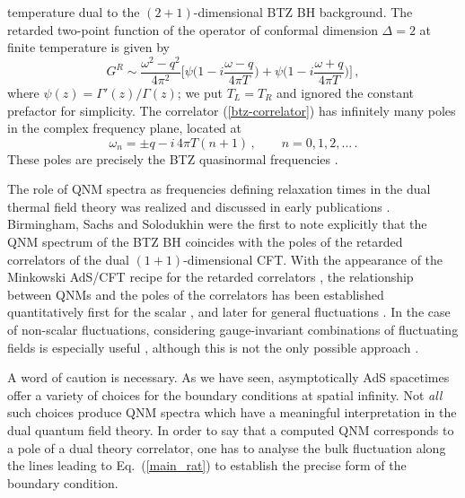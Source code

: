 \documentclass[]{iopart}
\def\be{\begin{equation}}
\def\ee{\end{equation}}
\begin{document}
temperature dual to the $(2+1)$-dimensional BTZ BH background.  The retarded
two-point function of the operator of conformal dimension $\Delta =2$ at
finite temperature is given by \cite{Son:2002sd}
%
\be
G^R \sim \frac{\omega^2-q^2}{4\pi^2} \Biggl[ \psi \Biggl( 1 - i \frac{\omega - q}{4 \pi T} \Biggr)
+ \psi \Biggl( 1 - i \frac{\omega + q}{4 \pi T} \Biggr) \Biggr]\,,
\label{btz-correlator}
\ee
%
where $\psi(z) = \Gamma'(z)/\Gamma(z)$; we put $T_L=T_R$ and ignored the
constant prefactor for simplicity.  The correlator (\ref{btz-correlator}) has
infinitely many poles in the complex frequency plane, located at
%
\begin{equation}
\omega_n = \pm q - i \, 4 \pi T (n+1)\,, \qquad n=0,1,2,...\,.
\end{equation}
%
These poles are precisely the BTZ quasinormal frequencies \cite{Chan:1996yk,
  Cardoso:2001hn, Birmingham:2001hc}.

The role of QNM spectra as frequencies defining relaxation times in the dual
thermal field theory was realized and discussed in early publications
\cite{KalyanaRama:1999zj, Horowitz:1999jd, Danielsson:1999fa}.  Birmingham,
Sachs and Solodukhin \cite{Birmingham:2001pj} were the first to note
explicitly that the QNM spectrum of the BTZ BH coincides with the poles of the
retarded correlators of the dual $(1+1)$-dimensional CFT.
%
With the appearance of the Minkowski AdS/CFT recipe for the retarded
correlators \cite{Son:2002sd}, the relationship between QNMs and the poles of
the correlators has been established quantitatively first for the scalar
\cite{Son:2002sd}, \cite{Starinets:2002br} and later for general fluctuations
\cite{Nunez:2003eq, Kovtun:2005ev}.  In the case of non-scalar fluctuations,
considering gauge-invariant combinations of fluctuating fields is especially
useful \cite{Kovtun:2005ev}, although this is not the only possible approach
\cite{Policastro:2002tn, Amado:2009ts}.

A word of caution is necessary. As we have seen, asymptotically AdS spacetimes
offer a variety of choices for the boundary conditions at spatial infinity.
Not {\it all} such choices produce QNM spectra which have a meaningful
interpretation in the dual quantum field theory. In order to say that a
computed QNM corresponds to a pole of a dual theory correlator, one has to
analyse the bulk fluctuation along the lines leading to Eq.~(\ref{main_rat})
to establish the precise form of the boundary condition.



\end{document}

